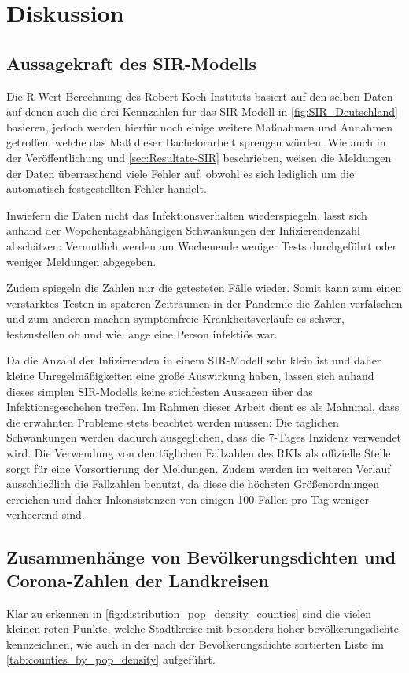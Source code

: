 \chapter{Diskussion}\label{chap:Diskussion}
\section{Aussagekraft des SIR-Modells}
Die R-Wert Berechnung des Robert-Koch-Instituts basiert auf den selben Daten auf denen auch die drei Kennzahlen für das SIR-Modell in \autoref{fig:SIR_Deutschland} basieren\autocite{RKI_Bulletin}, jedoch werden hierfür noch einige weitere Maßnahmen und Annahmen getroffen, welche das Maß dieser Bachelorarbeit sprengen würden.\autocite{RKI_Bulletin}
Wie auch in der Veröffentlichung und \autoref{sec:Resultate-SIR} beschrieben, weisen die Meldungen der Daten überraschend viele Fehler auf, obwohl es sich lediglich um die automatisch festgestellten Fehler handelt.

Inwiefern die Daten nicht das Infektionsverhalten wiederspiegeln, lässt sich anhand der Wopchentagsabhängigen Schwankungen der Infizierendenzahl abschätzen: Vermutlich werden am Wochenende weniger Tests durchgeführt oder weniger Meldungen abgegeben. 

Zudem spiegeln die Zahlen nur die getesteten Fälle wieder. Somit kann zum einen verstärktes Testen in späteren Zeiträumen in der Pandemie die Zahlen verfälschen und zum anderen machen symptomfreie Krankheitsverläufe es schwer, festzustellen ob und wie lange eine Person infektiös war.

Da die Anzahl der Infizierenden in einem SIR-Modell sehr klein ist und daher kleine Unregelmäßigkeiten eine große Auswirkung haben, lassen sich anhand dieses simplen SIR-Modells keine stichfesten Aussagen über das Infektionsgeschehen treffen.
Im Rahmen dieser Arbeit dient es als Mahnmal, dass die erwähnten Probleme stets beachtet werden müssen:
Die täglichen Schwankungen werden dadurch ausgeglichen, dass die 7-Tages Inzidenz verwendet wird. Die Verwendung von den täglichen Fallzahlen des RKIs als offizielle Stelle sorgt für eine Vorsortierung der Meldungen. Zudem werden im weiteren Verlauf ausschließlich die Fallzahlen benutzt, da diese die höchsten Größenordnungen erreichen und daher Inkonsistenzen von einigen 100 Fällen pro Tag weniger verheerend sind.

\section{Zusammenhänge von Bevölkerungsdichten und Corona-Zahlen der Landkreisen}\label{sec:discussion:pop_density_counties}
Klar zu erkennen in \autoref{fig:distribution_pop_density_counties} sind die vielen kleinen roten Punkte, welche Stadtkreise mit besonders hoher bevölkerungsdichte kennzeichnen, wie auch in der nach der Bevölkerungsdichte sortierten Liste im \autoref{tab:counties_by_pop_density} aufgeführt.

